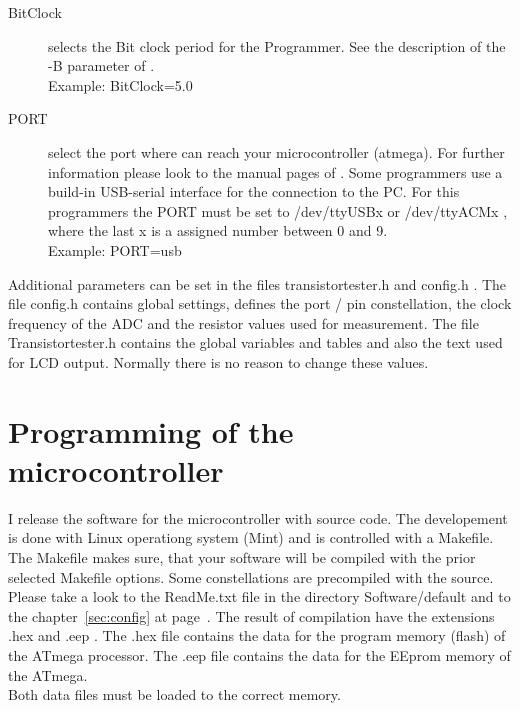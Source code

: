 \begin{description}
  \item[BitClock] selects the Bit clock period for the Programmer. See the description of the -B parameter of .\\
Example: BitClock=5.0

  \item[PORT] select the port where  can reach your microcontroller (atmega).
  For further information please look to the manual pages of .
Some programmers use a build-in USB-serial interface for the connection to the PC.
For this programmers the PORT must be set to /dev/ttyUSBx or /dev/ttyACMx , where
the last x is a assigned number between 0 and 9.\\
Example: PORT=usb

\end{description}

Additional parameters can be set in the files transistortester.h and config.h .
The file config.h contains global settings, defines the port / pin constellation,
 the clock frequency of the ADC and the resistor values used for measurement.
The file Transistortester.h contains the global variables and tables and also the text used for LCD output.
Normally there is no reason to change these values.



\section{Programming of the microcontroller}
I release the software for the microcontroller with source code.
The developement is done with Linux operationg system (Mint) and
is controlled with a Makefile.
The Makefile makes sure, that your software will be compiled with the prior selected Makefile options.
Some constellations are precompiled with the source.
Please take a look to the ReadMe.txt file
in the directory Software/default and to the chapter~\ref{sec:config} at page~\pageref{sec:config}.
The result of compilation have the extensions .hex and .eep .
The .hex file contains the data for the program memory (flash) of the ATmega processor.
The .eep file contains the data for the EEprom memory of the ATmega.\\
Both data files must be loaded to the correct memory.

